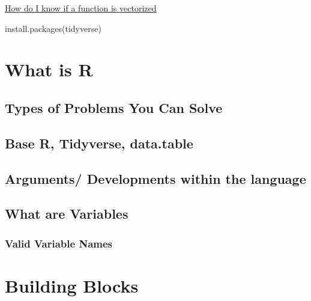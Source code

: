 \documentclass[
]{book}
\newenvironment{Shaded}{\begin{snugshade}}{\end{snugshade}}
\newcommand{\FunctionTok}[1]{\textcolor[rgb]{0.00,0.00,0.00}{#1}}
\newcommand{\NormalTok}[1]{#1}
\newcommand{\StringTok}[1]{\textcolor[rgb]{0.31,0.60,0.02}{#1}}
\begin{document}
\href{https://stackoverflow.com/questions/58568392/how-do-i-know-a-function-or-an-operation-in-r-is-vectorized\#:~:text=To\%20identify\%20if\%20an\%20R\%20object\%20is\%20a\%20vector\%20\%2C\%20I,a\%20vector\%20or\%20False\%20otherwise.}{How do I know if a function is vectorized}

\begin{Shaded}
\begin{Highlighting}[]
\FunctionTok{install.packages}\NormalTok{(}\StringTok{\textquotesingle{}tidyverse\textquotesingle{}}\NormalTok{)}
\end{Highlighting}
\end{Shaded}

\hypertarget{what-is-r}{%
\chapter{What is R}\label{what-is-r}}

\hypertarget{types-of-problems-you-can-solve}{%
\section{Types of Problems You Can Solve}\label{types-of-problems-you-can-solve}}

\hypertarget{base-r-tidyverse-data.table}{%
\section{Base R, Tidyverse, data.table}\label{base-r-tidyverse-data.table}}

\hypertarget{arguments-developments-within-the-language}{%
\section{Arguments/ Developments within the language}\label{arguments-developments-within-the-language}}

\hypertarget{what-are-variables}{%
\section{What are Variables}\label{what-are-variables}}

\hypertarget{valid-variable-names}{%
\subsection{Valid Variable Names}\label{valid-variable-names}}

\hypertarget{functions}{%
\chapter{Building Blocks}\label{functions}}
\end{document}
